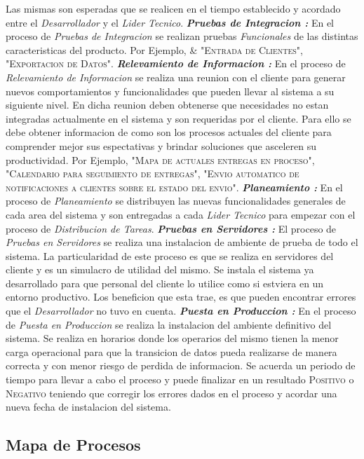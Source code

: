 \documentclass[
10pt, %
a4paper, %
oneside, %
headinclude,footinclude, %
BCOR5mm, %
]{scrartcl}
\begin{document}
  Las mismas son esperadas que se realicen en el tiempo establecido y acordado
  entre el \textit{Desarrollador} y el \textit{Lider Tecnico}.
  \newline  \newline
  \textbf{ \emph{Pruebas de Integracion : } } En el proceso de
  \textit{Pruebas de Integracion} se realizan pruebas \emph{Funcionales} de
  las distintas caracteristicas del producto. Por Ejemplo,
  \newline
  \& "\textsc{Entrada de Clientes}", "\textsc{Exportacion de Datos}".
  \newline  \newline
  \textbf{ \emph{Relevamiento de Informacion : } } En el proceso de
  \textit{Relevamiento de Informacion} se realiza una reunion con el cliente
  para generar nuevos comportamientos y funcionalidades que pueden llevar al
  sistema a su siguiente nivel. En dicha reunion deben obtenerse que necesidades
  no estan integradas actualmente en el sistema y son requeridas por el cliente.
  Para ello se debe obtener informacion de como son los procesos actuales del
  cliente para comprender mejor sus espectativas y brindar soluciones que
  asceleren su productividad.
  Por Ejemplo,
  "\textsc{Mapa de actuales entregas en proceso}",
  "\textsc{Calendario para seguimiento de entregas}",
  "\textsc{Envio automatico de notificaciones a clientes sobre el estado del envio}".
  \newline  \newline
  \textbf{ \emph{Planeamiento : } } En el proceso de \textit{Planeamiento} se
  distribuyen las nuevas funcionalidades generales de cada area del sistema y
  son entregadas a cada \textit{Lider Tecnico} para empezar con el proceso de
  \textit{Distribucion de Tareas}.
  \newline  \newline
  \textbf{ \emph{Pruebas en Servidores : } } El proceso de
  \textit{Pruebas en Servidores} se realiza una instalacion de ambiente
  de prueba de todo el sistema. La particularidad de este proceso es que
  se realiza en servidores del cliente y es un simulacro de utilidad del mismo.
  Se instala el sistema ya desarrollado para que personal del cliente lo
  utilice como si estviera en un entorno productivo. Los beneficion que esta
  trae, es que pueden encontrar errores que el \textit{Desarrollador} no tuvo
  en cuenta.
  \newline  \newline
  \textbf{ \emph{Puesta en Produccion : } } En el proceso de
  \textit{Puesta en Produccion} se realiza la instalacion del ambiente
  definitivo del sistema. Se realiza en horarios donde los operarios del mismo
  tienen la menor carga operacional para que la transicion de datos pueda
  realizarse de manera correcta y con menor riesgo de perdida de informacion.
  Se acuerda un periodo de tiempo para llevar a cabo el proceso y puede
  finalizar en un resultado \textsc{Positivo} o \textsc{Negativo} teniendo
  que corregir los errores dados en el proceso y acordar una nueva fecha de
  instalacion del sistema.

\pagebreak

  \subsection{Mapa de Procesos}
    
\end{document}
